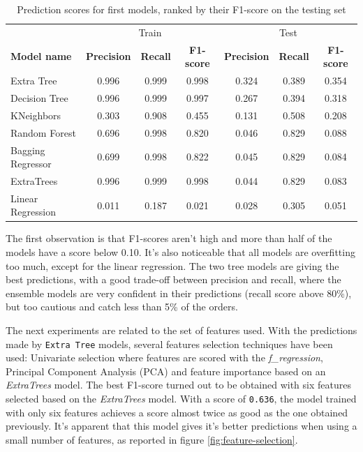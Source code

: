 \begin{table}[htb]
    \begin{tabular}{l|ccc|ccc}
                          & \multicolumn{3}{c|}{Train}                         & \multicolumn{3}{c}{Test}      \\
        \textbf{Model name}        & \textbf{Precision} & \textbf{Recall} & \textbf{F1-score} & \textbf{Precision} & \textbf{Recall} & \textbf{F1-score} \\ \hline
        Extra Tree        & 0.996     & 0.999  & 0.998                         & 0.324     & 0.389  & 0.354    \\
        Decision Tree     & 0.996     & 0.999  & 0.997                         & 0.267     & 0.394  & 0.318   \\
        KNeighbors        & 0.303     & 0.908  & 0.455                         & 0.131     & 0.508  & 0.208    \\
        Random Forest     & 0.696     & 0.998  & 0.820                         & 0.046     & 0.829  & 0.088    \\
        Bagging Regressor & 0.699     & 0.998  & 0.822                         & 0.045     & 0.829  & 0.084    \\
        ExtraTrees        & 0.996     & 0.999  & 0.998                         & 0.044     & 0.829  & 0.083    \\
        Linear Regression & 0.011     & 0.187  & 0.021                         & 0.028     & 0.305  & 0.051    
    \end{tabular}
    \caption[Prediction scores for first models]{Prediction scores for first models, ranked by their F1-score on the testing set}
    \label{tab:scores-simple-models}
\end{table}

The first observation is that F1-scores aren't high and more than half of the models have a score below 0.10. It's also noticeable that all models are overfitting too much, except for the linear regression. The two tree models are giving the best predictions, with a good trade-off between precision and recall, where the ensemble models are very confident in their predictions (recall score above 80\%), but too cautious and catch less than 5\% of the orders.

The next experiments are related to the set of features used. With the predictions made by \texttt{Extra Tree} models, several features selection techniques have been used: Univariate selection where features are scored with the \textit{f\_regression}, Principal Component Analysis (PCA) and feature importance based on an \textit{ExtraTrees} model. The best F1-score turned out to be obtained with six features selected based on the \textit{ExtraTrees} model. With a score of \texttt{0.636}, the model trained with only six features achieves a score almost twice as good as the one obtained previously. It's apparent that this model gives it's better predictions when using a small number of features, as reported in figure \ref{fig:feature-selection}.

